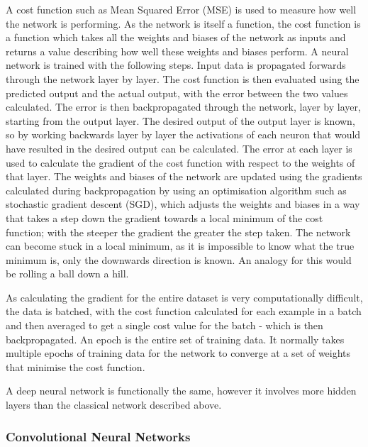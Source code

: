 \documentclass[twocolumn]{article}
\begin{document}
A cost function such as Mean Squared Error (MSE) is used to measure how well the network is performing.
As the network is itself a function, the cost function is a function which takes all the weights and biases of the network as inputs and returns a value describing how well these weights and biases perform.
A neural network is trained with the following steps.
Input data is propagated forwards through the network layer by layer.
The cost function is then evaluated using the predicted output and the actual output, with the error between the two values calculated.
The error is then backpropagated through the network, layer by layer, starting from the output layer.
The desired output of the output layer is known, so by working backwards layer by layer the activations of each neuron that would have resulted in the desired output can be calculated.
The error at each layer is used to calculate the gradient of the cost function with respect to the weights of that layer\autocite{leTutorialDeepLearning2015}.
The weights and biases of the network are updated using the gradients calculated during backpropagation by using an optimisation algorithm such as stochastic gradient descent (SGD)\autocite{ruderOverviewGradientDescent2016}, which adjusts the weights and biases in a way that takes a step down the gradient towards a local minimum of the cost function; with the steeper the gradient the greater the step taken.
The network can become stuck in a local minimum, as it is impossible to know what the true minimum is, only the downwards direction is known.
An analogy for this would be rolling a ball down a hill.

As calculating the gradient for the entire dataset is very computationally difficult, the data is batched, with the cost function calculated for each example in a batch and then averaged to get a single cost value for the batch - which is then backpropagated.
An epoch is the entire set of training data. It normally takes multiple epochs of training data for the network to converge at a set of weights that minimise the cost function.

A deep neural network is functionally the same, however it involves more hidden layers than the classical network described above.

\subsubsection{Convolutional Neural Networks}
\label{sec:org24db9db}
\end{document}
